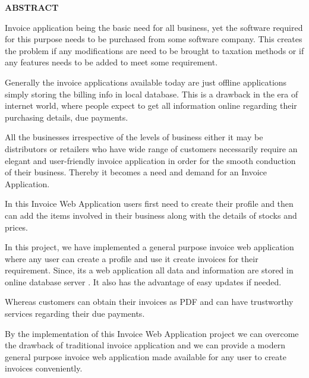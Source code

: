 \newpage
\begin{center}
\thispagestyle{empty}
\vspace*{2\baselineskip}
\LARGE{\textbf{ABSTRACT}}\\[0.5cm]
\end{center}
\thispagestyle{empty}
\doublespacing
\begin{normalsize}
Invoice application being the basic need for all business, yet the software required for this purpose needs to be purchased from some software company. This creates the problem if any modifications are need to be brought to taxation methods or if any features needs to be added to meet some requirement.

Generally the invoice applications available today are just offline applications simply storing the billing info in local database. This is a drawback in the era of internet world, where people expect to get all information online regarding their purchasing details, due payments.

All the businesses irrespective of the levels of business either it may be
distributors or retailers who have wide range of customers necessarily
require an elegant and user-friendly invoice application in order for the
smooth conduction of their business. Thereby it becomes a need and
demand for an Invoice Application.

In this Invoice Web Application users first need to create their profile and then can add the items involved in their business along with the details of stocks and prices.

In this project, we have implemented a general purpose invoice web application where any user can create a profile and use it create invoices for their requirement. Since, its a web application all data and information are stored in online database server . It also has the advantage of easy updates if needed.

Whereas customers can obtain their invoices as PDF and can have trustworthy services regarding their due payments.

By the implementation of this Invoice Web Application project we can overcome the drawback of traditional invoice application and we can provide a modern general purpose invoice web application made available for any user to create invoices conveniently.
\\[1cm]
\end{normalsize}